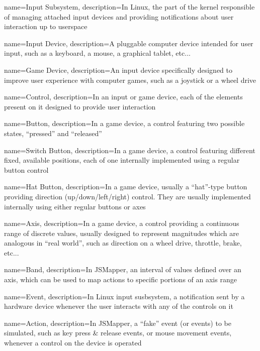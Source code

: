 {
  name=Input Subsystem,
  description={In Linux, the part of the kernel responsible of managing attached input devices and providing notifications about user interaction up to userspace}
}

{
  name=Input Device,
  description={A pluggable computer device intended for user input, such as a keyboard, a mouse, a graphical tablet, etc...}
}

{
  name=Game Device,
  description={An input device specifically designed to improve user experience with computer games, such as a joystick or a wheel drive}
}

{
  name=Control,
  description={In an input or game device, each of the elements present on it designed to provide user interaction}
}

{
  name=Button,
  description={In a game device, a control featuring two possible states, ``pressed'' and ``released''}
}

{
  name=Switch Button,
  description={In a game device, a control featuring different fixed, available positions, each of one internally implemented using a regular button control}
}

{
  name=Hat Button,
  description={In a game device, usually a ``hat''-type button providing direction (up/down/left/right) control. They are usually implemented internally using either regular buttons or axes}
}

{
  name=Axis,
  description={In a game device, a control providing a continuous range of discrete values, usually designed to represent magnitudes which are analogous in ``real world'', such as direction on a wheel drive, throttle, brake, etc... }
}

{
  name=Band,
  description={In JSMapper, an interval of values defined over an axis, which can be used to map actions to specific portions of an axis range}
}

{
  name=Event,
  description={In Linux input susbsystem, a notification sent by a hardware device whenever the user interacts with any of the controls on it}
}

{
  name=Action,
  description={In JSMapper, a ``fake'' event (or events) to be simulated, such as key press \& release events, or mouse movement events, whenever a control on the device is operated}
}

